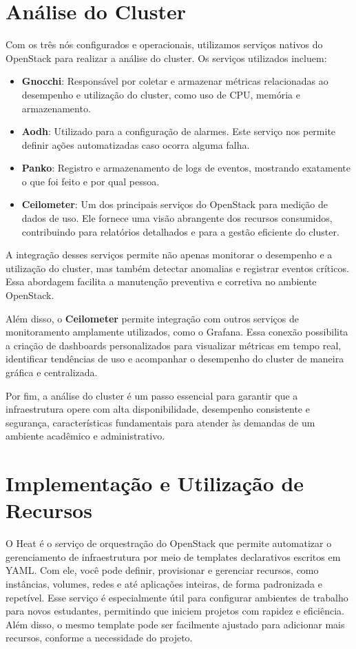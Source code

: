 \section{Análise do Cluster}

Com os três nós configurados e operacionais, utilizamos serviços nativos do OpenStack para realizar a análise do cluster. Os serviços utilizados incluem:

\begin{itemize}
    \item \textbf{Gnocchi}: Responsável por coletar e armazenar métricas relacionadas ao desempenho e utilização do cluster, como uso de CPU, memória e armazenamento.
    \item \textbf{Aodh}: Utilizado para a configuração de alarmes. Este serviço nos permite definir ações automatizadas caso ocorra alguma falha.
    \item \textbf{Panko}: Registro e armazenamento de logs de eventos, mostrando exatamente o que foi feito e por qual pessoa.
    \item \textbf{Ceilometer}: Um dos principais serviços do OpenStack para medição de dados de uso. Ele fornece uma visão abrangente dos recursos consumidos, contribuindo para relatórios detalhados e para a gestão eficiente do cluster.
\end{itemize}

A integração desses serviços permite não apenas monitorar o desempenho e a utilização do cluster, mas também detectar anomalias e registrar eventos críticos. Essa abordagem facilita a manutenção preventiva e corretiva no ambiente OpenStack.

Além disso, o \textbf{Ceilometer} permite integração com outros serviços de monitoramento amplamente utilizados, como o Grafana. Essa conexão possibilita a criação de dashboards personalizados para visualizar métricas em tempo real, identificar tendências de uso e acompanhar o desempenho do cluster de maneira gráfica e centralizada. 

Por fim, a análise do cluster é um passo essencial para garantir que a infraestrutura opere com alta disponibilidade, desempenho consistente e segurança, características fundamentais para atender às demandas de um ambiente acadêmico e administrativo.


\section{Implementação e Utilização de Recursos}
O Heat é o serviço de orquestração do OpenStack que permite automatizar o gerenciamento de infraestrutura por meio de templates declarativos escritos em YAML. Com ele, você pode definir, provisionar e gerenciar recursos, como instâncias, volumes, redes e até aplicações inteiras, de forma padronizada e repetível. Esse serviço é especialmente útil para configurar ambientes de trabalho para novos estudantes, permitindo que iniciem projetos com rapidez e eficiência. Além disso, o mesmo template pode ser facilmente ajustado para adicionar mais recursos, conforme a necessidade do projeto.

